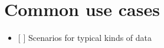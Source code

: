 \section{Common use cases}\label{common-use-cases}

\begin{itemize}
\tightlist
\item
  {[} {]} Scenarios for typical kinds of data
\end{itemize}
